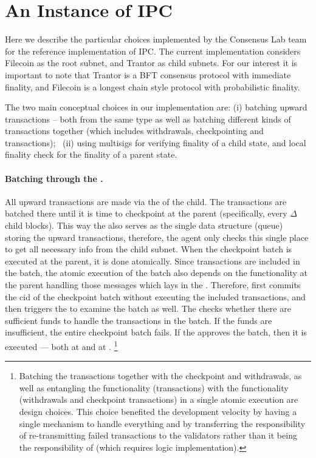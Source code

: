  \section{An Instance of IPC}
 \label{sec:impl-tmpl}
 Here we describe the particular choices implemented by the Consensus Lab team for the reference implementation of IPC.  
 The current implementation considers Filecoin as the root subnet, and Trantor as child subnets. For our interest it is important to note that Trantor is a BFT consensus protocol with immediate finality, and Filecoin is a longest chain style protocol with probabilistic finality. 
 
 The two main conceptual choices in our implementation are: (i) batching upward transactions -- both from the same type as well as batching different kinds of transactions together (which includes withdrawals, checkpointing and \postoffice transactions); \ (ii) using multisigs for verifying finality of a child state, and local finality check for the finality of a parent state.


\paragraph{Batching through the \gw.}
All upward transactions are made via the \gw of the child. The transactions are batched there until it is time to checkpoint at the parent (specifically, every $\Delta$ child blocks). This way the \gw also serves as the single data structure (queue) storing the upward transactions, therefore, the agent only checks this single place to get all necessary info from the child subnet.
When the checkpoint batch is executed at the parent, it is done atomically. Since \postoffice transactions are included in the batch, the atomic execution of the batch also depends on the \postoffice functionality at the parent handling those messages which lays in the \gw. Therefore, \sa first commits the cid of the checkpoint batch without executing the included transactions, and then triggers the \gw to examine the batch as well. The \gw checks whether there are sufficient funds to handle the \postoffice transactions in the batch. If the funds are insufficient, the entire checkpoint batch fails. If the \gw approves the batch, then it is executed --- both at \sa and at \gw.%
\footnote{Batching the \postoffice transactions together with the checkpoint and withdrawals, as well as entangling the \gw functionality (\postoffice transactions) with the \sa functionality (withdrawals and checkpoint transactions) in a single atomic execution are design choices. This choice benefited the development velocity by having a single mechanism to handle everything and by transferring the responsibility of re-transmitting failed \postoffice transactions to the validators rather than it being the responsibility of \sa (which requires logic implementation).}



